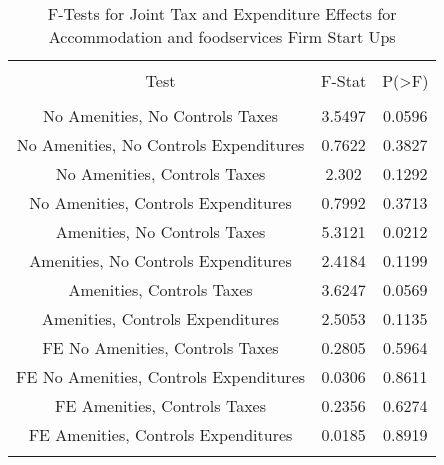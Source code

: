 
\begin{table}[!htbp] \centering 
  \caption{F-Tests for Joint Tax and Expenditure Effects for Accommodation and foodservices Firm Start Ups} 
  \label{72Ftests} 
\begin{tabular}{@{\extracolsep{5pt}} ccc} 
\\[-1.8ex]\hline 
\hline \\[-1.8ex] 
Test & F-Stat & P(\textgreater F) \\ 
\hline \\[-1.8ex] 
No Amenities, No Controls Taxes & 3.5497 & 0.0596 \\ 
No Amenities, No Controls Expenditures & 0.7622 & 0.3827 \\ 
No Amenities, Controls Taxes & 2.302 & 0.1292 \\ 
No Amenities, Controls Expenditures & 0.7992 & 0.3713 \\ 
Amenities, No Controls Taxes & 5.3121 & 0.0212 \\ 
Amenities, No Controls Expenditures & 2.4184 & 0.1199 \\ 
Amenities, Controls Taxes & 3.6247 & 0.0569 \\ 
Amenities, Controls Expenditures & 2.5053 & 0.1135 \\ 
FE No Amenities, Controls Taxes & 0.2805 & 0.5964 \\ 
FE No Amenities, Controls Expenditures & 0.0306 & 0.8611 \\ 
FE Amenities, Controls Taxes & 0.2356 & 0.6274 \\ 
FE Amenities, Controls Expenditures & 0.0185 & 0.8919 \\ 
\hline \\[-1.8ex] 
\end{tabular} 
\end{table} 
